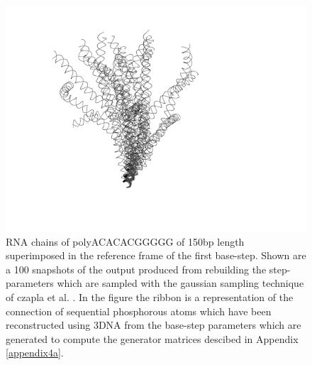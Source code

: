 \begin{figure}
\centering
\includegraphics[angle=0, scale=0.6]{Chapter4/polyacacacggggg.png}
\caption{RNA chains of polyACACACGGGGG of 150bp length superimposed in
the reference frame of the first base-step. Shown are a 100 snapshots
of the output produced from rebuilding the step-parameters which are
sampled with the gaussian sampling technique of czapla et al. \cite{czapla2006}.
In the figure the ribbon is a representation of the connection of
sequential phosphorous atoms which have been reconstructed using 3DNA
from the base-step parameters which are generated to compute the
generator matrices descibed in Appendix \ref{appendix4a}.}
\end{figure}  



















